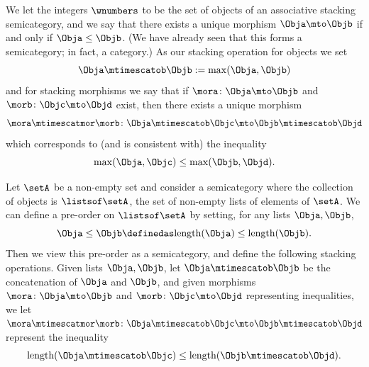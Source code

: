 \begin{example}\label{ex:assoc-stacking-semicat-integers-max}
    We let the integers $\wnumbers$ to be the set of objects of an associative stacking semicategory, and we say that there exists a unique morphism $\Obja \mto \Objb$ if and only if $\Obja \leq \Objb$.
    (We have already seen that this forms a semicategory; in fact, a category.) As our stacking operation for objects we set
    \begin{equation}
        \Obja \mtimescatob \Objb := \max(\Obja, \Objb)
    \end{equation}
    and for stacking morphisms we say that if $\mora \colon \Obja \mto \Objb$ and $\morb \colon \Objc \mto \Objd$ exist, then there exists a unique morphism
    \begin{equation}
        \mora \mtimescatmor \morb \colon \Obja \mtimescatob \Objc \mto \Objb \mtimescatob \Objd
    \end{equation}
    which corresponds to (and is consistent with) the inequality
    \begin{equation}
        \max(\Obja, \Objc) \leq \max(\Objb, \Objd).
    \end{equation}
\end{example}

\begin{example}\label{ex:assoc-stacking-semicat-lists-concat}
    Let $\setA$ be a non-empty set and consider a semicategory where the collection of objects is $ \listsof \setA$, the set of non-empty lists of elements of $\setA$.
    We can define a pre-order on $\listsof \setA$ by setting, for any lists $\Obja, \Objb$,
    \begin{equation}
        \Obja \leq \Objb \definedas \text{length}(\Obja) \leq \text{length}(\Objb).
    \end{equation}
    Then we view this pre-order as a semicategory, and define the following stacking operations.
    Given lists $\Obja, \Objb$, let $\Obja \mtimescatob \Objb$ be the concatenation of $\Obja$ and $\Objb$, and given morphisms $\mora \colon \Obja \mto \Objb$ and $\morb \colon \Objc \mto \Objd$ representing inequalities, we let $\mora \mtimescatmor \morb \colon \Obja \mtimescatob \Objc \mto \Objb \mtimescatob \Objd$ represent the inequality
    \begin{equation}
        \text{length}(\Obja \mtimescatob \Objc) \leq \text{length}(\Objb \mtimescatob \Objd).
    \end{equation}

\end{example}

